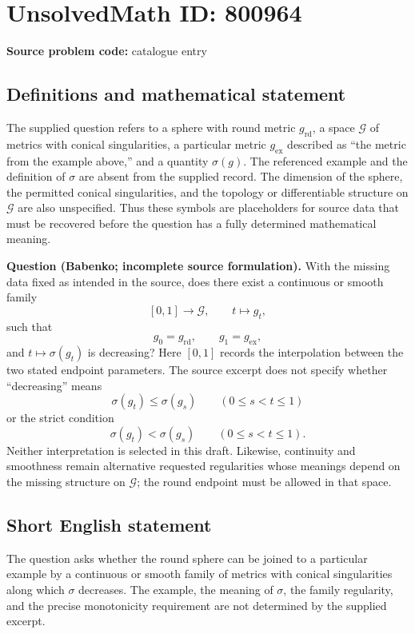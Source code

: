 \documentclass[11pt]{article}
\begin{document}
\section*{UnsolvedMath ID: 800964}
\textbf{Source problem code:} catalogue entry
\subsection{Definitions and mathematical statement}
The supplied question refers to a sphere with round metric \(g_{\mathrm{rd}}\), a space \(\mathcal G\) of metrics with conical singularities, a particular metric \(g_{\mathrm{ex}}\) described as ``the metric from the example above,'' and a quantity \(\sigma(g)\). The referenced example and the definition of \(\sigma\) are absent from the supplied record. The dimension of the sphere, the permitted conical singularities, and the topology or differentiable structure on \(\mathcal G\) are also unspecified. Thus these symbols are placeholders for source data that must be recovered before the question has a fully determined mathematical meaning.

\textbf{Question (Babenko; incomplete source formulation).} With the missing data fixed as intended in the source, does there exist a continuous or smooth family
\[
[0,1]\longrightarrow\mathcal G,\qquad t\longmapsto g_t,
\]
such that
\[
g_0=g_{\mathrm{rd}},\qquad g_1=g_{\mathrm{ex}},
\]
and \(t\mapsto\sigma(g_t)\) is decreasing? Here \([0,1]\) records the interpolation between the two stated endpoint parameters. The source excerpt does not specify whether ``decreasing'' means
\[
\sigma(g_t)\leq\sigma(g_s)\qquad(0\leq s<t\leq1)
\]
or the strict condition
\[
\sigma(g_t)<\sigma(g_s)\qquad(0\leq s<t\leq1).
\]
Neither interpretation is selected in this draft. Likewise, continuity and smoothness remain alternative requested regularities whose meanings depend on the missing structure on \(\mathcal G\); the round endpoint must be allowed in that space.
\subsection{Short English statement}
The question asks whether the round sphere can be joined to a particular example by a continuous or smooth family of metrics with conical singularities along which \(\sigma\) decreases. The example, the meaning of \(\sigma\), the family regularity, and the precise monotonicity requirement are not determined by the supplied excerpt.
\end{document}
